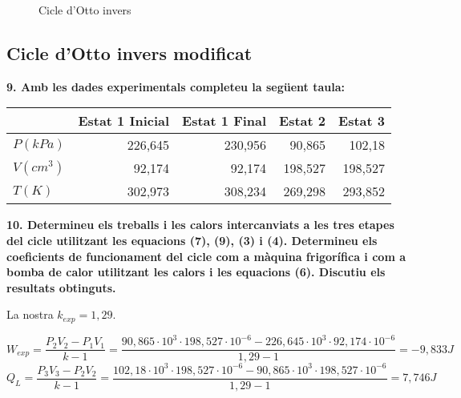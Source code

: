 \documentclass[a4paper]{article}
\begin{document}
\begin{figure}[H]
    \centering
    \caption{Cicle d'Otto invers}
    \label{fig:cicle_otto_invers}
\end{figure}

\subsection*{Cicle d'Otto invers modificat}

\textbf{9. Amb les dades experimentals completeu la següent taula:}

\begin{center}
	\begin{tabular}{l|rrrr}
		& Estat 1 Inicial & Estat 1 Final & Estat 2 & Estat 3 \\
		\hline
		$P(kPa)$ & 226,645 & 230,956 & 90,865 & 102,18 \\
		$V(cm^3)$ & 92,174 & 92,174 & 198,527 & 198,527 \\
		$T(K)$ & 302,973 & 308,234 & 269,298 & 293,852 \\
	\end{tabular}
\end{center}

\textbf{10. Determineu els treballs i les calors intercanviats a les tres etapes del cicle utilitzant les equacions (7), (9), (3) i (4). Determineu els coeficients de funcionament del cicle com a màquina frigorífica i com a bomba de calor utilitzant les calors i les equacions (6). Discutiu els resultats obtinguts.}

La nostra $k_{exp} = 1,29$.

$$ W_{exp} = \frac{P_2 V_2 - P_1 V_1}{k - 1} = 
\frac{90,865·10^3 · 198,527·10^{-6} - 226,645·10^3 · 92,174·10^{-6}}{1,29 - 1} = \boxed{-9,833 J} $$
$$ Q_L = \frac{P_3 V_3 - P_2 V_2}{k - 1} = 
\frac{102,18·10^3 · 198,527·10^{-6} - 90,865·10^3 · 198,527·10^{-6}}{1,29-1} = \boxed{7,746 J} $$
\end{document}
